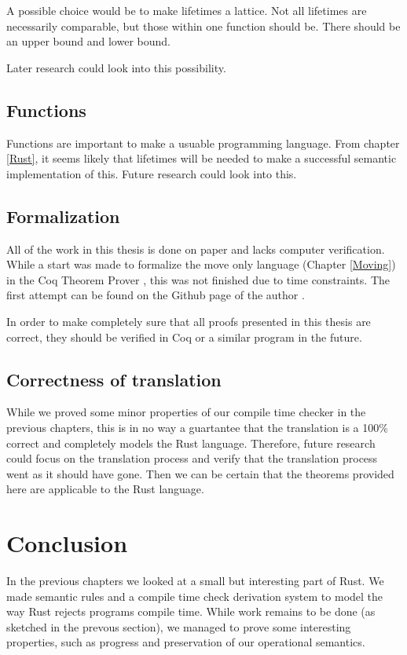 A possible choice would be to make lifetimes a lattice. Not all lifetimes are necessarily comparable, but those within one function should be. There should be an upper bound and lower bound. 

Later research could look into this possibility. 

\subsection{Functions}
Functions are important to make a usuable programming language. From chapter \ref{Rust}, it seems likely that lifetimes will be needed to make a successful semantic implementation of this. Future research could look into this. 

\subsection{Formalization}
All of the work in this thesis is done on paper and lacks computer verification. While a start was made to formalize the move only language (Chapter \ref{Moving}) in the Coq Theorem Prover \citep{barras1997coq}, this was not finished due to time constraints. The first attempt can be found on the Github page of the author \citep{github}. 

In order to make completely sure that all proofs presented in this thesis are correct, they should be verified in Coq or a similar program in the future. 

\subsection{Correctness of translation}
While we proved some minor properties of our compile time checker in the previous chapters, this is in no way a guartantee that the translation is a 100\% correct and completely models the Rust language. Therefore, future research could focus on the translation process and verify that the translation process went as it should have gone. Then we can be certain that the theorems provided here are applicable to the Rust language. 

\section{Conclusion}
In the previous chapters we looked at a small but interesting part of Rust. We made semantic rules and a compile time check derivation system to model the way Rust rejects programs compile time. While work remains to be done (as sketched in the prevous section), we managed to prove some interesting properties, such as progress and preservation of our operational semantics.
